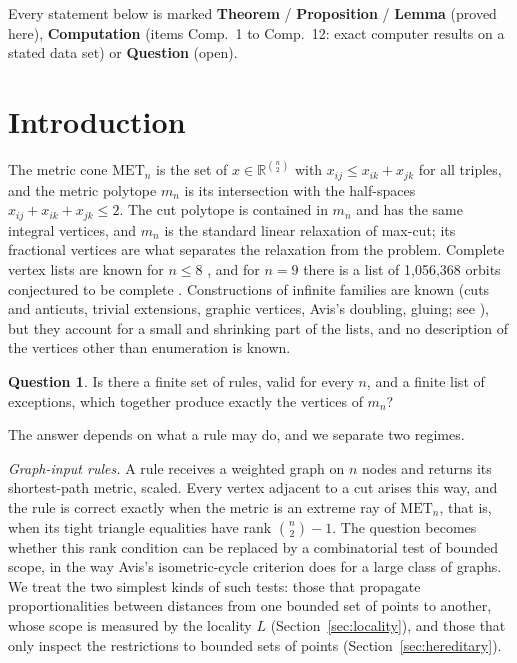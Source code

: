 \documentclass[11pt,a4paper]{article}
\theoremstyle{definition}
\newtheorem*{questionz}{Question}
\theoremstyle{remark}
\newcommand{\MET}{\mathrm{MET}}
\newcommand{\R}{\mathbb{R}}
\begin{document}
Every statement below is marked \textbf{Theorem} / \textbf{Proposition} / \textbf{Lemma} (proved here),
\textbf{Computation} (items Comp.~1 to Comp.~12: exact computer results on a stated data set) or \textbf{Question} (open).

\section{Introduction}

The metric cone $\MET_n$ is the set of $x \in \R^{\binom n2}$ with $x_{ij} \le x_{ik} + x_{jk}$ for all triples, and
the metric polytope $m_n$ is its intersection with the half-spaces $x_{ij} + x_{ik} + x_{jk} \le 2$. The cut polytope
is contained in $m_n$ and has the same integral vertices, and $m_n$ is the standard linear relaxation of max-cut; its
fractional vertices are what separates the relaxation from the problem. Complete vertex lists are known for
$n \le 8$ \cite{DFPS01,DFMV03}, and for $n = 9$ there is a list of 1,056,368 orbits conjectured to be complete
\cite{DI07}. Constructions of infinite families are known (cuts and anticuts, trivial extensions, graphic vertices,
Avis's doubling, gluing; see \cite{LP92,L96,DL97}), but they account for a small and shrinking part of the lists, and
no description of the vertices other than enumeration is known.

\begin{questionz}
Is there a finite set of rules, valid for every $n$, and a finite list of exceptions, which together produce exactly
the vertices of $m_n$?
\end{questionz}

The answer depends on what a rule may do, and we separate two regimes.

\emph{Graph-input rules.} A rule receives a weighted graph on $n$ nodes and returns its shortest-path metric, scaled.
Every vertex adjacent to a cut arises this way, and the rule is correct exactly when the metric is an extreme ray of
$\MET_n$, that is, when its tight triangle equalities have rank $\binom n2 - 1$. The question becomes whether this
rank condition can be replaced by a combinatorial test of bounded scope, in the way Avis's isometric-cycle criterion
\cite{A80} does for a large class of graphs. We treat the two simplest kinds of such tests: those that propagate
proportionalities between distances from one bounded set of points to another, whose scope is measured by the
locality $L$ (Section~\ref{sec:locality}), and those that only inspect the restrictions to bounded sets of points
(Section~\ref{sec:hereditary}).
\end{document}
